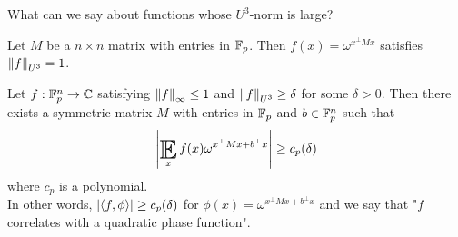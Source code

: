 \documentclass{article}
\begin{document}
What can we say about functions whose $U^3$-norm is large?

\begin{nex}
  Let $M$ be a $n \times n$ matrix with entries in $\mathbb F_p$. Then $f(x) = \omega^{x^\perp M x}$ satisfies $\left\lVert f\right\rVert_{U^3} = 1$.
\end{nex}

\begin{nthm}
  Let $f : \mathbb F_p^n \to \mathbb C$ satisfying $\left\lVert f\right\rVert_\infty \le 1$ and $\left\lVert f\right\rVert_{U^3} \ge \delta$ for some $\delta > 0$. Then there exists a symmetric matrix $M$ with entries in $\mathbb F_p$ and $b \in \mathbb F_p^n$ such that
  $$\abs{\E_x f(x) \omega^{x^\perp M x + b^\perp x}} \ge c_p(\delta)$$
  where $c_p$ is a polynomial. \\
  In other words, $\left\lvert \langle f, \phi\rangle\right\rvert \ge c_p(\delta)$ for $\phi(x) = \omega^{x^\perp M x + b^\perp x}$ and we say that "$f$ correlates with a quadratic phase function".
\end{nthm}
\end{document}
